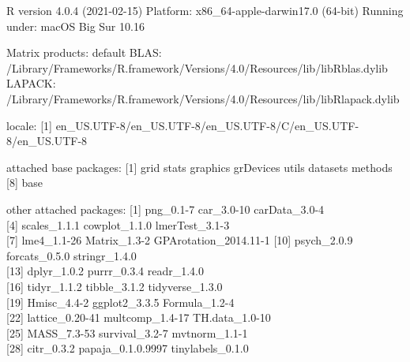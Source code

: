 \documentclass[
  english,
  man, noextraspace]{apa7}
\begin{document}
\begin{appendix}
R version 4.0.4 (2021-02-15) Platform: x86\_64-apple-darwin17.0 (64-bit)
Running under: macOS Big Sur 10.16

Matrix products: default BLAS:
/Library/Frameworks/R.framework/Versions/4.0/Resources/lib/libRblas.dylib
LAPACK:
/Library/Frameworks/R.framework/Versions/4.0/Resources/lib/libRlapack.dylib

locale: {[}1{]}
en\_US.UTF-8/en\_US.UTF-8/en\_US.UTF-8/C/en\_US.UTF-8/en\_US.UTF-8

attached base packages: {[}1{]} grid stats graphics grDevices utils
datasets methods\\
{[}8{]} base

other attached packages: {[}1{]} png\_0.1-7 car\_3.0-10 carData\_3.0-4\\
{[}4{]} scales\_1.1.1 cowplot\_1.1.0 lmerTest\_3.1-3\\
{[}7{]} lme4\_1.1-26 Matrix\_1.3-2 GPArotation\_2014.11-1 {[}10{]}
psych\_2.0.9 forcats\_0.5.0 stringr\_1.4.0\\
{[}13{]} dplyr\_1.0.2 purrr\_0.3.4 readr\_1.4.0\\
{[}16{]} tidyr\_1.1.2 tibble\_3.1.2 tidyverse\_1.3.0\\
{[}19{]} Hmisc\_4.4-2 ggplot2\_3.3.5 Formula\_1.2-4\\
{[}22{]} lattice\_0.20-41 multcomp\_1.4-17 TH.data\_1.0-10\\
{[}25{]} MASS\_7.3-53 survival\_3.2-7 mvtnorm\_1.1-1\\
{[}28{]} citr\_0.3.2 papaja\_0.1.0.9997 tinylabels\_0.1.0


\end{appendix}
\end{document}
